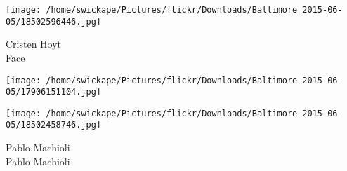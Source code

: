 \documentclass[10pt,letterpaper]{article}
\begin{document}
\vspace{0.25in}
\texttt{[image: /home/swickape/Pictures/flickr/Downloads/Baltimore 2015-06-05/18502596446.jpg]}

Cristen Hoyt\\
Face
\pagebreak

\texttt{[image: /home/swickape/Pictures/flickr/Downloads/Baltimore 2015-06-05/17906151104.jpg]}

\vspace{0.25in}
\texttt{[image: /home/swickape/Pictures/flickr/Downloads/Baltimore 2015-06-05/18502458746.jpg]}

Pablo Machioli\\
Pablo Machioli
\pagebreak
\end{document}
